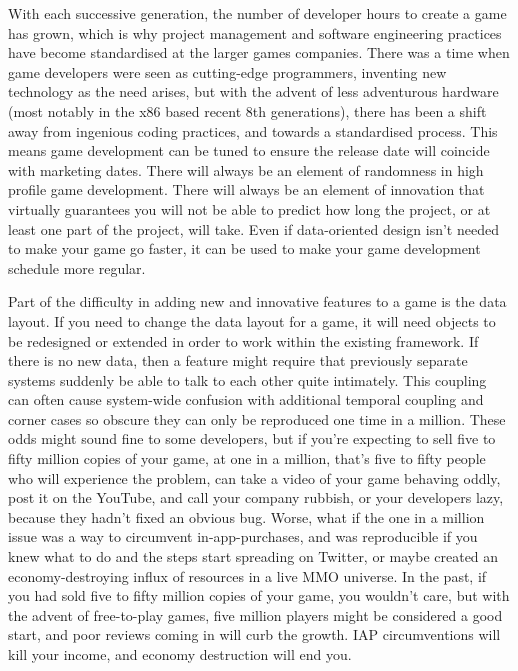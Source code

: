 \documentclass[a4paper,12pt]{article}
\begin{document}
With each successive generation, the number of developer hours to create a game has grown, which is why project management and software engineering practices have become standardised at the larger games companies.
There was a time when game developers were seen as cutting-edge programmers, inventing new technology as the need arises, but with the advent of less adventurous hardware (most notably in the x86 based recent 8th generations), there has been a shift away from ingenious coding practices, and towards a standardised process.
This means game development can be tuned to ensure the release date will coincide with marketing dates.
There will always be an element of randomness in high profile game development.
There will always be an element of innovation that virtually guarantees you will not be able to predict how long the project, or at least one part of the project, will take.
Even if data-oriented design isn't needed to make your game go faster, it can be used to make your game development schedule more regular.

Part of the difficulty in adding new and innovative features to a game is the data layout.
If you need to change the data layout for a game, it will need objects to be redesigned or extended in order to work within the existing framework.
If there is no new data, then a feature might require that previously separate systems suddenly be able to talk to each other quite intimately.
This coupling can often cause system-wide confusion with additional temporal coupling and corner cases so obscure they can only be reproduced one time in a million.
These odds might sound fine to some developers, but if you're expecting to sell five to fifty million copies of your game, at one in a million, that's five to fifty people who will experience the problem, can take a video of your game behaving oddly, post it on the YouTube, and call your company rubbish, or your developers lazy, because they hadn't fixed an obvious bug.
Worse, what if the one in a million issue was a way to circumvent in-app-purchases, and was reproducible if you knew what to do and the steps start spreading on Twitter, or maybe created an economy-destroying influx of resources in a live MMO universe.
In the past, if you had sold five to fifty million copies of your game, you wouldn't care, but with the advent of free-to-play games, five million players might be considered a good start, and poor reviews coming in will curb the growth.
IAP circumventions will kill your income, and economy destruction will end you.
\end{document}
